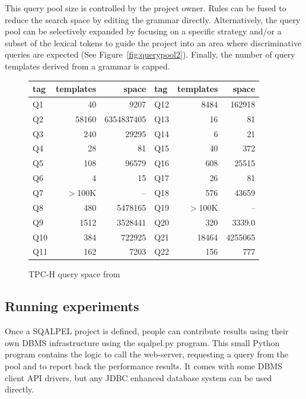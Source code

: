 \documentclass{cidr-2019}
\begin{document}

This query pool size is controlled by the project owner. Rules can be
fused to reduce the search space by editing the grammar directly.
Alternatively, the query pool can be selectively expanded by focusing
on a specific strategy and/or a subset of the lexical tokens to guide
the project into an area where discriminative queries are expected
(See Figure~\ref{fig:querypool2}). Finally, the number of query
templates derived from a grammar is capped.
\begin{figure}[t]
{\small \begin{tabular}{ | l r r | l r r |}\hline tag & templates &
    space & tag & templates & space\\\hline Q1 & 40 & 9207 & Q12 &
    8484 & 162918 \\ Q2 & 58160 & 6354837405 & Q13 & 16 & 81\\ Q3 &
    240 & 29295 & Q14 & 6 & 21\\ Q4 & 28 & 81 & Q15 & 40 & 372 \\ Q5 &
    108 & 96579 & Q16 & 608 & 25515\\ Q6 & 4 & 15 & Q17 & 26 & 81
    \\ Q7 & $>$100K & -- & Q18 & 576 & 43659\\ Q8 & 480 & 5478165 &
    Q19 & $>$100K & --\\ Q9 & 1512 & 3528441 & Q20 & 320 &
    3339.0\\ Q10 & 384 & 722925 & Q21 & 18464 & 4255065 \\ Q11 & 162 &
    7203 & Q22 & 156& 777\\ \hline
	\end{tabular}
	\caption{TPC-H query space from
          \cite{DBLP:conf/sigmod/KerstenKZ18}\label{table:tpch-count}}}
\end{figure}

\subsection{Running experiments}

Once a {\sc SQALPEL} project is defined, people can contribute results
using their own DBMS infrastructure using the {\sc sqalpel.py}
program. This small Python program contains the logic to call the
web-server, requesting a query from the pool and to report back the
performance results. It comes with some DBMS client API drivers, but
any JDBC enhanced database system can be used directly.
\end{document}
